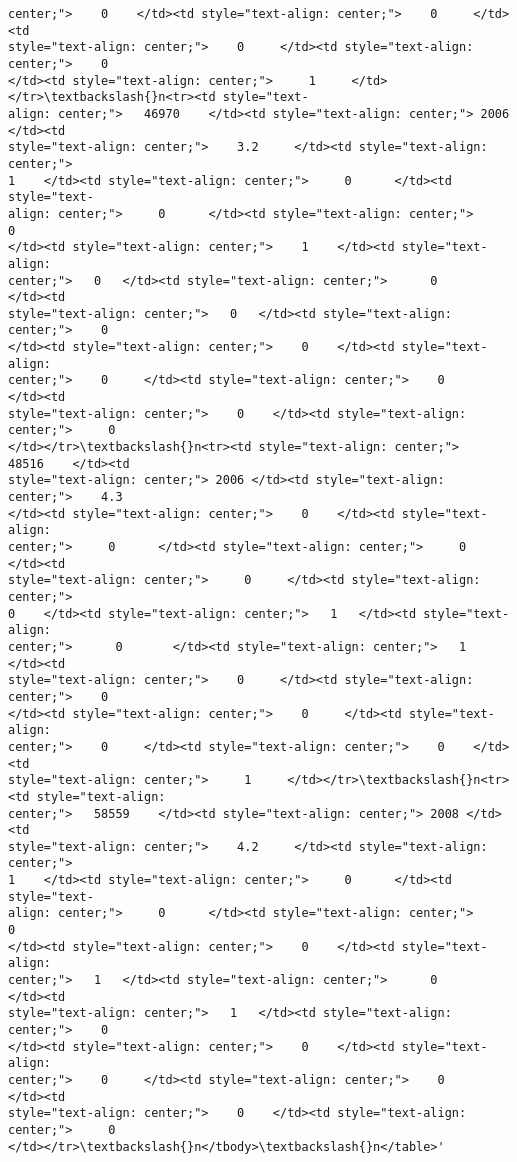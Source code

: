 \documentclass[11pt]{article}
\begin{document}
\begin{tcolorbox}[breakable, size=fbox, boxrule=.5pt, pad at break*=1mm, opacityfill=0]
\begin{Verbatim}[commandchars=\\\{\}]
center;">    0    </td><td style="text-align: center;">    0     </td><td
style="text-align: center;">    0     </td><td style="text-align: center;">    0
</td><td style="text-align: center;">     1     </td></tr>\textbackslash{}n<tr><td style="text-
align: center;">   46970    </td><td style="text-align: center;"> 2006 </td><td
style="text-align: center;">    3.2     </td><td style="text-align: center;">
1    </td><td style="text-align: center;">     0      </td><td style="text-
align: center;">     0      </td><td style="text-align: center;">     0
</td><td style="text-align: center;">    1    </td><td style="text-align:
center;">   0   </td><td style="text-align: center;">      0       </td><td
style="text-align: center;">   0   </td><td style="text-align: center;">    0
</td><td style="text-align: center;">    0    </td><td style="text-align:
center;">    0     </td><td style="text-align: center;">    0     </td><td
style="text-align: center;">    0    </td><td style="text-align: center;">     0
</td></tr>\textbackslash{}n<tr><td style="text-align: center;">   48516    </td><td
style="text-align: center;"> 2006 </td><td style="text-align: center;">    4.3
</td><td style="text-align: center;">    0    </td><td style="text-align:
center;">     0      </td><td style="text-align: center;">     0      </td><td
style="text-align: center;">     0     </td><td style="text-align: center;">
0    </td><td style="text-align: center;">   1   </td><td style="text-align:
center;">      0       </td><td style="text-align: center;">   1   </td><td
style="text-align: center;">    0     </td><td style="text-align: center;">    0
</td><td style="text-align: center;">    0     </td><td style="text-align:
center;">    0     </td><td style="text-align: center;">    0    </td><td
style="text-align: center;">     1     </td></tr>\textbackslash{}n<tr><td style="text-align:
center;">   58559    </td><td style="text-align: center;"> 2008 </td><td
style="text-align: center;">    4.2     </td><td style="text-align: center;">
1    </td><td style="text-align: center;">     0      </td><td style="text-
align: center;">     0      </td><td style="text-align: center;">     0
</td><td style="text-align: center;">    0    </td><td style="text-align:
center;">   1   </td><td style="text-align: center;">      0       </td><td
style="text-align: center;">   1   </td><td style="text-align: center;">    0
</td><td style="text-align: center;">    0    </td><td style="text-align:
center;">    0     </td><td style="text-align: center;">    0     </td><td
style="text-align: center;">    0    </td><td style="text-align: center;">     0
</td></tr>\textbackslash{}n</tbody>\textbackslash{}n</table>'
\end{Verbatim}
\end{tcolorbox}
        
\end{document}
